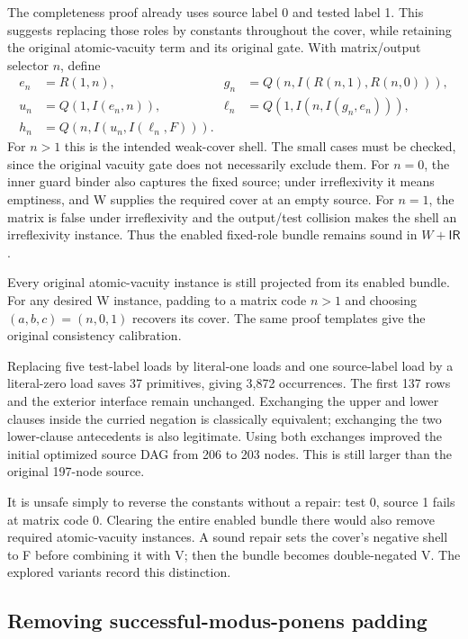 \documentclass[11pt,a4paper]{article}
\newcommand{\IR}{\mathsf{IR}}
\begin{document}
The completeness proof already uses source label 0 and tested label 1.
This suggests replacing those roles by constants throughout the cover,
while retaining the original atomic-vacuity term and its original gate.
With matrix/output selector $n$, define
\begin{align*}
e_n&=R(1,n),&g_n&=Q(n,I(R(n,1),R(n,0))),\\
u_n&=Q(1,I(e_n,n)),&\ell_n&=Q(1,I(n,I(g_n,e_n))),\\
h_n&=Q(n,I(u_n,I(\ell_n,F))).
\end{align*}
For $n>1$ this is the intended weak-cover shell. The small cases must be
checked, since the original vacuity gate does not necessarily exclude them.
For $n=0$, the inner guard binder also captures the fixed source; under
irreflexivity it means emptiness, and W supplies the required cover at an
empty source. For $n=1$, the matrix is false under irreflexivity and the
output/test collision makes the shell an irreflexivity instance. Thus the
enabled fixed-role bundle remains sound in $W+\IR$.

Every original atomic-vacuity instance is still projected from its enabled
bundle. For any desired W instance, padding to a matrix code $n>1$ and
choosing $(a,b,c)=(n,0,1)$ recovers its cover. The same proof templates give
the original consistency calibration.

Replacing five test-label loads by literal-one loads and one source-label
load by a literal-zero load saves 37 primitives, giving 3,872 occurrences.
The first 137 rows and the exterior interface remain unchanged. Exchanging
the upper and lower clauses inside the curried negation is classically
equivalent; exchanging the two lower-clause antecedents is also legitimate.
Using both exchanges improved the initial optimized source DAG from 206
to 203 nodes. This is still larger than the original 197-node source.

It is unsafe simply to reverse the constants without a repair: test 0,
source 1 fails at matrix code 0. Clearing the entire enabled bundle there
would also remove required atomic-vacuity instances. A sound repair sets
the cover's negative shell to F before combining it with V; then the bundle
becomes double-negated V. The explored variants record this distinction.

\subsection{Removing successful-modus-ponens padding}
\end{document}
